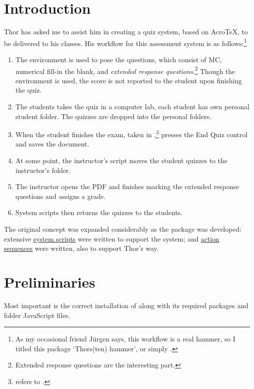 \documentclass{article}
\makeatletter
\def\heshe{\@ifstar{\heshei}{\global\advance\hesheCnt1\relax\heshei}}
\def\heshei{\ifodd\hesheCnt she\else he\fi}
\def\hisher{\@ifstar{\hisheri}{\global\advance\hesheCnt1\relax\hisheri}}
\def\hisheri{\ifodd\hesheCnt her\else his\fi}
\makeatother
\begin{document}
\section{Introduction}\label{intro}

Thor has asked me to assist him in creating a quiz system, based on
Acro\negthinspace\TeX, to be delivered to his classes. His workflow for this
assessment system is as follows:\footnote{As my occasional friend J\"{u}rgen
says, this workflow is a real hammer, so I titled this package `Thors(ten)
hammer', or simply .}
\begin{enumerate}
   \item The  environment is used to pose the questions, which
      consist of MC, numerical fill-in the blank, and \emph{extended response
      questions}.\footnote{Extended response questions are the interesting
      part.} Though the  environment is used, the score is not
      reported to the student upon finishing the quiz.
   \item The students takes the quiz in a computer lab, each student has
       {\hisher} own personal student folder. The quizzes are dropped into the
       personal folders.
   \item When the student finishes the exam, taken in ,\footnote{
       refers to .} {\heshe} presses the \textsf{End
       Quiz} control and saves the document.
   \item At some point, the instructor's script moves the student quizzes
       to the instructor's folder.
   \item The instructor opens the PDF and finishes marking the extended
       response questions and assigns a grade.
   \item System scripts then returns the quizzes to the students.
\end{enumerate}
The original concept was expanded considerably as the package was developed:
extensive \hyperref[s:sysscrpts]{system scripts} were written to support the
system; and \hyperref[actSeq]{action sequences} were written, also to support
Thor's way.


\section{Preliminaries}

Most important is the correct installation of  along with
its required packages and folder JavaScript files.
\end{document}
